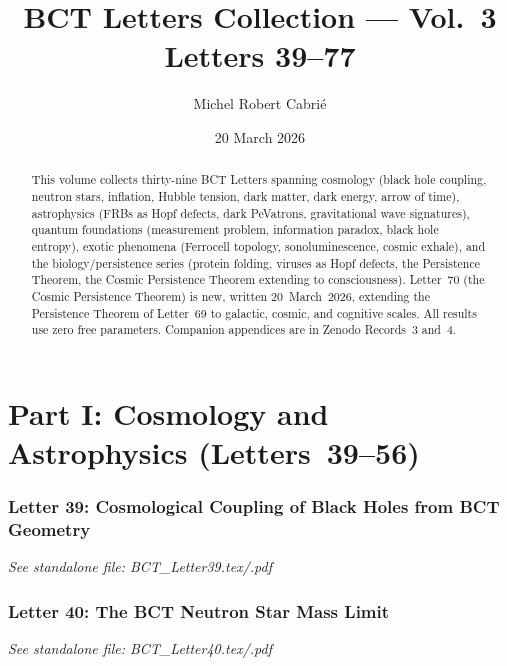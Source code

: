 \documentclass[aps,preprint,superscriptaddress,floatfix]{revtex4-2}
\begin{document}
\title{BCT Letters Collection --- Vol.~3\\Letters 39--77}

\author{Michel Robert Cabri\'{e}}
\date{20 March 2026}

\begin{abstract}
This volume collects thirty-nine BCT Letters spanning cosmology (black hole coupling, neutron stars, inflation, Hubble tension, dark matter, dark energy, arrow of time), astrophysics (FRBs as Hopf defects, dark PeVatrons, gravitational wave signatures), quantum foundations (measurement problem, information paradox, black hole entropy), exotic phenomena (Ferrocell topology, sonoluminescence, cosmic exhale), and the biology/persistence series (protein folding, viruses as Hopf defects, the Persistence Theorem, the Cosmic Persistence Theorem extending to consciousness). Letter~70 (the Cosmic Persistence Theorem) is new, written 20~March~2026, extending the Persistence Theorem of Letter~69 to galactic, cosmic, and cognitive scales. All results use zero free parameters. Companion appendices are in Zenodo Records~3 and~4.
\end{abstract}

\maketitle
\tableofcontents

\newpage
\part*{Part I: Cosmology and Astrophysics (Letters~39--56)}

\newpage
\section*{Letter 39: Cosmological Coupling of Black Holes from BCT Geometry}
\textit{See standalone file: BCT\_Letter39.tex/.pdf}

\newpage
\section*{Letter 40: The BCT Neutron Star Mass Limit}
\textit{See standalone file: BCT\_Letter40.tex/.pdf}
\end{document}

